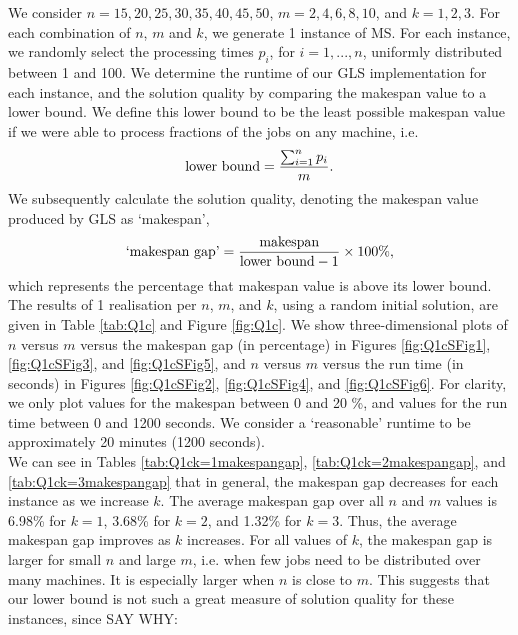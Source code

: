 \documentclass[12pt,a4paper,reqno]{article}
\begin{document}
We consider $n=15, 20, 25, 30, 35, 40, 45, 50$, $m=2,4,6,8,10$, and $k=1,2,3$. For each combination of $n$, $m$ and $k$, we generate 1 instance of MS. For each instance, we randomly select the processing times $p_i$, for $i=1,...,n$, uniformly distributed between 1 and 100. We determine the runtime of our GLS implementation for each instance, and the solution quality by comparing the makespan value to a lower bound. We define this lower bound to be the least possible makespan value if we were able to process fractions of the jobs on any machine, i.e.
\begin{equation}
\textnormal{lower bound} = \frac{\sum_{i=1}^n p_i}{m}.
\end{equation}
We subsequently calculate the solution quality, denoting the makespan value produced by GLS as `makespan',
\begin{equation}
\textnormal{`makespan gap'} = \frac{\textnormal{makespan}}{\textnormal{lower bound} - 1} \times 100\%,
\end{equation}
which represents the percentage that makespan value is above its lower bound. \\

The results of 1 realisation per $n$, $m$, and $k$, using a random initial solution, are given in Table \ref{tab:Q1c} and Figure \ref{fig:Q1c}.
We show three-dimensional plots of $n$ versus $m$ versus the makespan gap (in percentage) in Figures \ref{fig:Q1cSFig1}, \ref{fig:Q1cSFig3}, and \ref{fig:Q1cSFig5}, and $n$ versus $m$ versus the run time (in seconds) in Figures \ref{fig:Q1cSFig2}, \ref{fig:Q1cSFig4}, and \ref{fig:Q1cSFig6}. For clarity, we only plot values for the makespan between 0 and 20 \%, and values for the run time between 0 and 1200 seconds. We consider a `reasonable' runtime to be approximately 20 minutes (1200 seconds). \\

We can see in Tables \ref{tab:Q1ck=1makespangap}, \ref{tab:Q1ck=2makespangap}, and \ref{tab:Q1ck=3makespangap} that in general, the makespan gap decreases for each instance as we increase $k$. The average makespan gap over all $n$ and $m$ values is 6.98\% for $k=1$, 3.68\% for $k=2$, and 1.32\% for $k=3$. Thus, the average makespan gap improves as $k$ increases. For all values of $k$, the makespan gap is larger for small $n$ and large $m$, i.e. when few jobs need to be distributed over many machines. It is especially larger when $n$ is close to $m$. This suggests that our lower bound is not such a great measure of solution quality for these instances, since \color{red} SAY WHY: \color{black} \\
\end{document}
